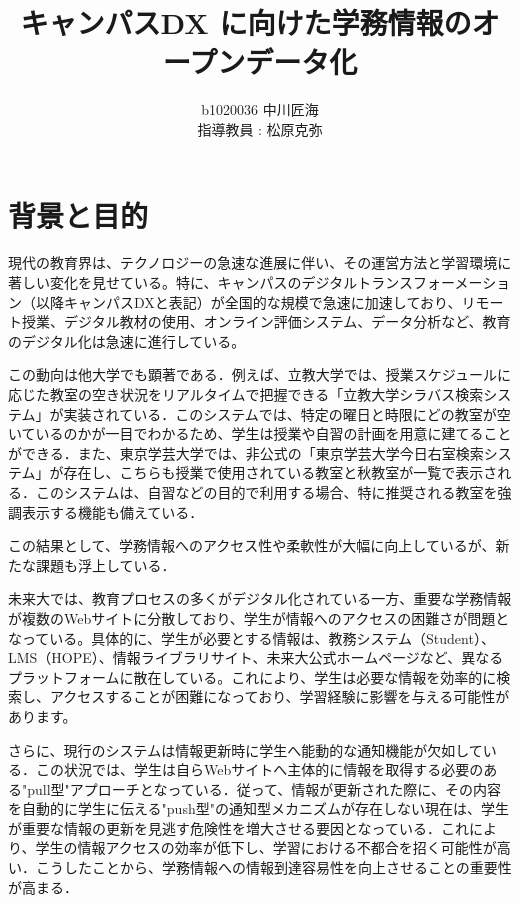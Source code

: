 \documentclass[11pt]{ujarticle}
\author{%
b1020036 中川匠海\\指導教員 : 松原克弥
}
\title{キャンパスDX に向けた学務情報のオープンデータ化}
\begin{document}
\maketitle

\section{背景と目的}

現代の教育界は、テクノロジーの急速な進展に伴い、その運営方法と学習環境に著しい変化を見せている。特に、キャンパスのデジタルトランスフォーメーション（以降キャンパスDXと表記）が全国的な規模で急速に加速しており、リモート授業、デジタル教材の使用、オンライン評価システム、データ分析など、教育のデジタル化は急速に進行している。

この動向は他大学でも顕著である．例えば、立教大学では、授業スケジュールに応じた教室の空き状況をリアルタイムで把握できる「立教大学シラバス検索システム」が実装されている．このシステムでは、特定の曜日と時限にどの教室が空いているのかが一目でわかるため、学生は授業や自習の計画を用意に建てることができる．また、東京学芸大学では、非公式の「東京学芸大学今日右室検索システム」が存在し、こちらも授業で使用されている教室と秋教室が一覧で表示される．このシステムは、自習などの目的で利用する場合、特に推奨される教室を強調表示する機能も備えている．

この結果として、学務情報へのアクセス性や柔軟性が大幅に向上しているが、新たな課題も浮上している．

未来大では、教育プロセスの多くがデジタル化されている一方、重要な学務情報が複数のWebサイトに分散しており、学生が情報へのアクセスの困難さが問題となっている。具体的に、学生が必要とする情報は、教務システム（Student）、LMS（HOPE）、情報ライブラリサイト、未来大公式ホームページなど、異なるプラットフォームに散在している。これにより、学生は必要な情報を効率的に検索し、アクセスすることが困難になっており、学習経験に影響を与える可能性があります。

さらに、現行のシステムは情報更新時に学生へ能動的な通知機能が欠如している．この状況では、学生は自らWebサイトへ主体的に情報を取得する必要のある"pull型"アプローチとなっている．従って、情報が更新された際に、その内容を自動的に学生に伝える"push型"の通知型メカニズムが存在しない現在は、学生が重要な情報の更新を見逃す危険性を増大させる要因となっている．これにより、学生の情報アクセスの効率が低下し、学習における不都合を招く可能性が高い．こうしたことから、学務情報への情報到達容易性を向上させることの重要性が高まる．

\end{document}
